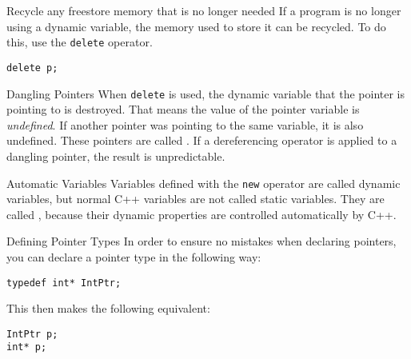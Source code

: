 \documentclass[\main/notes.tex]{subfiles}
\begin{document}
				\begin{sidenote}{Recycle any freestore memory that is no longer needed}
					If a program is no longer using a dynamic variable, the memory used to store it can be recycled. To do this, use the \texttt{delete} operator.
					\begin{verbatim}
delete p;
					\end{verbatim}
				\end{sidenote}
				\begin{sidenote}{Dangling Pointers}
					When \texttt{delete} is used, the dynamic variable that the pointer is pointing to is destroyed. That means the value of the pointer variable is \emph{undefined}. If another pointer was pointing to the same variable, it is also undefined. These pointers are called . If a dereferencing operator is applied to a dangling pointer, the result is unpredictable.
				\end{sidenote}
				\begin{definition}{Automatic Variables}
					Variables defined with the \texttt{new} operator are called dynamic variables, but normal C++ variables are not called static variables. They are called , because their dynamic properties are controlled automatically by C++.
				\end{definition}
				\begin{sidenote}{Defining Pointer Types}
					In order to ensure no mistakes when declaring pointers, you can declare a pointer type in the following way:
					\begin{verbatim}
typedef int* IntPtr;
					\end{verbatim}
					This then makes the following equivalent:
					\begin{verbatim}
IntPtr p;
int* p;
					\end{verbatim}
				\end{sidenote}

		\pagebreak
\end{document}
